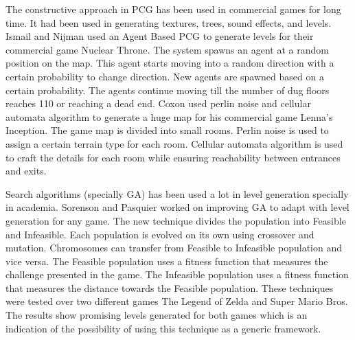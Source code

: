 The constructive approach in PCG has been used in commercial games for long time. It had been used in generating textures, trees, sound effects, and levels. Ismail and Nijman\cite{nuclearThrone} used an Agent Based PCG to generate levels for their commercial game Nuclear Throne. The system spawns an agent at a random position on the map. This agent starts moving into a random direction with a certain probability to change direction. New agents are spawned based on a certain probability. The agents continue moving till the number of dug floors reaches 110 or reaching a dead end. Coxon\cite{lennaInception} used perlin noise and cellular automata algorithm to generate a huge map for his commercial game Lenna's Inception. The game map is divided into small rooms. Perlin noise is used to assign a certain terrain type for each room. Cellular automata algorithm is used to craft the details for each room while ensuring reachability between entrances and exits.\\\par

Search algorithms (specially GA) has been used a lot in level generation specially in academia. Sorenson and Pasquier\cite{genericLevelFramework} worked on improving GA to adapt with level generation for any game. The new technique divides the population into Feasible and Infeasible. Each population is evolved on its own using crossover and mutation. Chromosomes can transfer from Feasible to Infeasible population and vice versa. The Feasible population uses a fitness function that measures the challenge presented in the game. The Infeasible population uses a fitness function that measures the distance towards the Feasible population. These techniques were tested over two different games The Legend of Zelda and Super Mario Bros. The results show promising levels generated for both games which is an indication of the possibility of using this technique as a generic framework.\\\par

